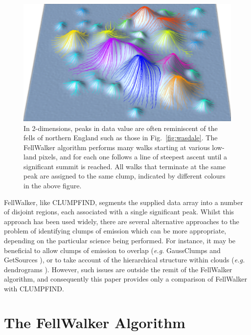 \documentclass[final,authoryear,5p,times,twocolumn]{elsarticle}
\begin{document}
\begin{figure}
\includegraphics[width=\columnwidth]{fellwalking}
\caption{In 2-dimensions, peaks in data value are often reminiscent of the
fells of northern England such as those in Fig.~\ref{fig:wasdale}. The
FellWalker algorithm performs many walks starting at various low-land
pixels, and for each one follows a line of steepest ascent until a
significant summit is reached. All walks that terminate at the same peak
are assigned to the same clump, indicated by different colours in the
above figure.}
\label{fig:fellwalking}
\end{figure}

FellWalker, like CLUMPFIND, segments the supplied data array into a
number of disjoint regions, each associated with a single significant
peak. Whilst this approach has been used widely, there are several
alternative approaches to the problem of identifying clumps of emission
which can be more appropriate, depending on the particular science being
performed. For instance, it may be beneficial to allow clumps of emission
to overlap (\emph{e.g.} GaussClumps \citep[][]{1990ApJ...356..513S}
and GetSources \citep{GetSources}), or to take account of the hierarchical
structure within clouds (\emph{e.g.} dendrograms \citep{2008Rosolowsky}). However,
such issues are outside the remit of the FellWalker algorithm, and consequently
this paper provides only a comparison of FellWalker with CLUMPFIND.

\section{The FellWalker Algorithm}
\end{document}
